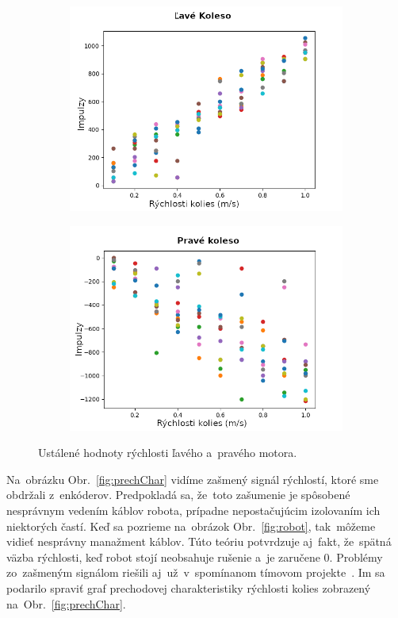 \begin{figure}[!htbp]
	\begin{subfigure}{0.5\textwidth}
		\includegraphics[width=\textwidth]{img/Left_wheel_2.png}
	\end{subfigure}
	\hfill
	\begin{subfigure}{0.5\textwidth}
		\includegraphics[width=\textwidth]{img/Right_wheel_2.png}
	\end{subfigure}
	\caption{Ustálené hodnoty rýchlosti ľavého a~pravého motora. }
	\label{fig:lavePraveKoleso}
\end{figure}

Na~obrázku Obr.~\ref{fig:prechChar} vidíme zašmený signál rýchlostí, ktoré sme obdržali z~enkóderov. Predpokladá sa,
že~toto zašumenie je spôsobené nesprávnym vedením káblov robota, prípadne nepostačujúcim izolovaním ich niektorých
častí. Keď sa pozrieme na~obrázok Obr.~\ref{fig:robot}, tak~môžeme vidieť nesprávny manažment káblov. Túto teóriu
potvrdzuje aj~fakt, že~spätná väzba rýchlosti, keď robot stojí neobsahuje rušenie a~je zaručene 0. Problémy zo~zašmeným
signálom riešili aj~už~v~spomínanom tímovom projekte~\cite{timovyProjekt}. Im sa podarilo spraviť graf prechodovej
charakteristiky rýchlosti kolies zobrazený na~Obr.~\ref{fig:prechChar}.

